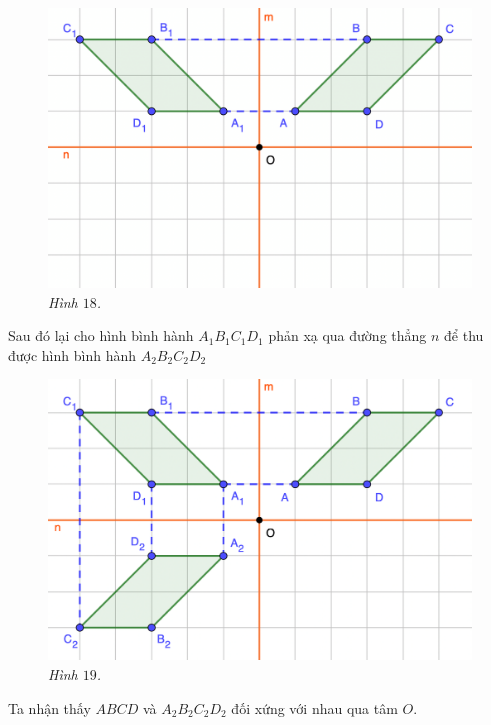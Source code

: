 \begin{multicols}{2}
	\begin{figure}[H]
		\vspace*{-5pt}
		\centering
		\captionsetup{labelformat= empty, justification=centering}
		\includegraphics[width= 1\linewidth]{18}
		\caption{\small\textit{\color{toancuabi}Hình $18$.}}
		\vspace*{-10pt}
	\end{figure}
	Sau đó lại cho hình bình hành $A_1B_1C_1D_1$ phản xạ qua đường thẳng $n$ để thu được hình bình hành $A_2B_2C_2D_2$
	\begin{figure}[H]
		\vspace*{-5pt}
		\centering
		\captionsetup{labelformat= empty, justification=centering}
		\includegraphics[width= 1\linewidth]{19}
		\caption{\small\textit{\color{toancuabi}Hình $19$.}}
		\vspace*{-10pt}
	\end{figure}
	Ta nhận thấy $ABCD$ và $A_2B_2C_2D_2$ đối xứng với nhau qua tâm $O$.

\end{multicols}
